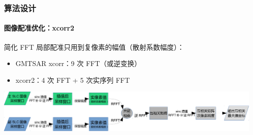 \documentclass{beamer}
\begin{document}
\begin{frame}
    \frametitle{算法设计}
    \framesubtitle{图像配准优化：xcorr2}

    \begin{block}{简化 FFT}
        局部配准只用到复像素的幅值（散射系数幅度）：
        \begin{itemize}
            \item GMTSAR xcorr：9 次 FFT（或逆变换）
            \item xcorr2：4 次 FFT + 5 次实序列 FFT
        \end{itemize}
        \includegraphics[width=0.99\textwidth]{figures/xcorr2-crop.pdf}
    \end{block}
\end{frame}
\end{document}
